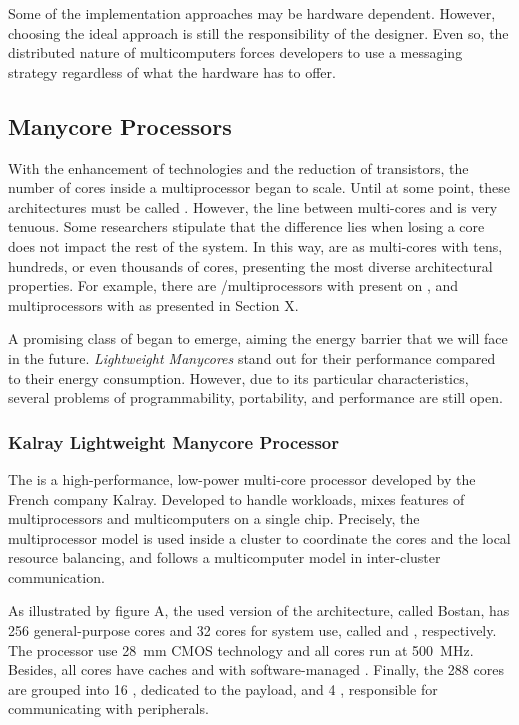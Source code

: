 				Some of the implementation approaches may be hardware dependent.
				However, choosing the ideal approach is still the responsibility of the \os designer.
				Even so, the distributed nature of multicomputers forces developers to
				use a messaging strategy regardless of what the hardware has to offer.
	
	\subsection{Manycore Processors}

		With the enhancement of technologies and the reduction of transistors,
		the number of cores inside a multiprocessor began to scale.
		Until at some point, these architectures must be called \manycores.
		However, the line between multi-cores and \manycores is very tenuous.
		Some researchers stipulate that the difference lies when losing a core
		does not impact the rest of the system.
		In this way, \manycores are as multi-cores with tens, hundreds, or even
		thousands of cores, presenting the most diverse architectural properties.
		For example, there are \uma/\numa multiprocessors with \simd present on
		\gpus, and \numa multiprocessors with \mimd as \mppa presented in Section X.

		A promising class of \manycores began to emerge, aiming the energy barrier
		that we will face in the future.
		\textit{Lightweight Manycores} stand out for their performance compared
		to their energy consumption.
		However, due to its particular characteristics, several problems of
		programmability, portability, and performance are still open.

		\subsubsection{Kalray \mppa Lightweight Manycore Processor}

			The \mppa is a high-performance, low-power multi-core processor
			developed by the French company Kalray.
			Developed to handle \mimd workloads, \mppa mixes features of
			multiprocessors and multicomputers on a single chip.
			Precisely, the multiprocessor model is used inside a cluster
			to coordinate the cores and the local resource balancing, and
			follows a multicomputer model in inter-cluster communication.

			As illustrated by figure A, the used version of the architecture,
			called Bostan, has 256 general-purpose cores and 32 cores for
			system use, called \pes and \rmans, respectively.
			The processor use 28~mm CMOS technology and all cores run at 500~MHz.
			Besides, all cores have caches and \mmus with software-managed \tlbs.
			Finally, the 288 cores are grouped into 16 \cclusters, dedicated to
			the payload, and 4 \ioclusters, responsible for communicating with peripherals.

